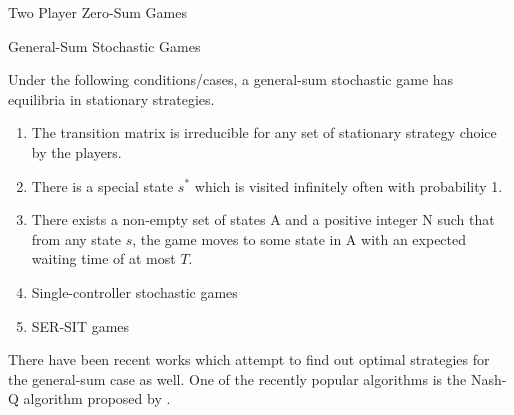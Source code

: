 \documentclass{article}
\begin{document}
\begin{psection}{Two Player Zero-Sum Games}
\begin{psubsection}{General-Sum Stochastic Games}
		\begin{theorem}
			\citep{survey}
			Under the following conditions/cases, a general-sum stochastic game has equilibria in stationary strategies.
			\begin{enumerate}
				\item The transition matrix is irreducible for any set of stationary strategy choice by the players.
				\item There is a special state $s^\ast$ which is visited infinitely often with probability 1.
				\item There exists a non-empty set of states A and a positive integer N such that from any state $s$, the game moves to some state in A with an expected waiting time of at most $T$.
				\item Single-controller stochastic games
				\item SER-SIT games
			\end{enumerate}
		\end{theorem}

		There have been recent works which attempt to find out optimal strategies for the general-sum case as well. One of the recently popular algorithms is the Nash-Q algorithm proposed by \cite{nashq}.

	\end{psubsection}

\end{psection}
\end{document}
